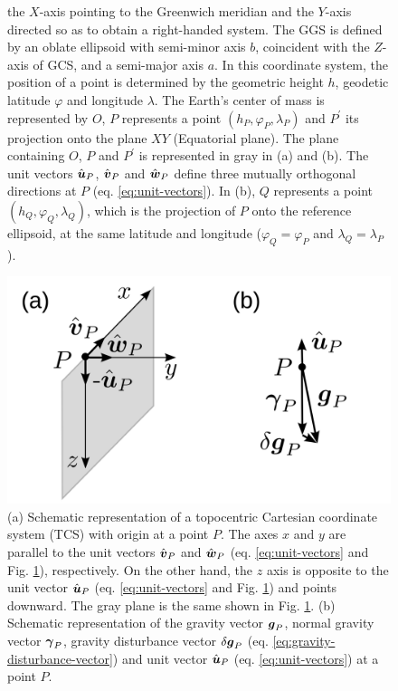 \documentclass[extra]{gji}
\begin{document}
\begin{figure}
{    the $X$-axis pointing to the Greenwich meridian and the $Y$-axis
    directed so as to obtain a right-handed system. The GGS is      defined by an oblate ellipsoid with semi-minor axis $b$,
    coincident with the $Z$-axis of GCS, and a semi-major
    axis $a$. In this coordinate system, the position of a point is
    determined by the geometric height $h$, geodetic latitude
    $\varphi$ and longitude $\lambda$.
    The Earth's center of mass is represented
    by $O$, $P$ represents a point $(h_{P}, \varphi_{P}, \lambda_{P})$ and $P^{\prime}$ its projection onto the plane $XY$
    (Equatorial plane). The plane containing $O$, $P$ and
    $P^{\prime}$ is represented in gray in (a) and (b).
    The unit vectors $\hat{\mitbf{u}}_{P}$, $\hat{\mitbf{v}}_{P}$ and
    $\hat{\mitbf{w}}_{P}$ define three mutually orthogonal
    directions at $P$ (eq. \ref{eq:unit-vectors}).
    In (b), $Q$ represents a point $(h_{Q}, \varphi_{Q}, \lambda_{Q})$,
    which is the projection of $P$ onto the reference ellipsoid, at
    the same latitude and longitude ($\varphi_{Q} = \varphi_{P}$ and $\lambda_{Q} = \lambda_{P}$).}
  \label{fig:GCS-GGS}
\end{figure}

\begin{figure}
    \includegraphics{figures/local-system.png}
    \caption{(a) Schematic representation of a topocentric Cartesian
    coordinate system (TCS) with origin at a point $P$. The axes $x$
    and $y$ are parallel to the unit vectors $\hat{\mitbf{v}}_{P}$
    and $\hat{\mitbf{w}}_{P}$ (eq. \ref{eq:unit-vectors} and
    Fig. \ref{fig:GCS-GGS}), respectively. On the other hand, the $z$ axis is opposite to the unit vector $\hat{\mitbf{u}}_{P}$ (eq.
    \ref{eq:unit-vectors} and Fig. \ref{fig:GCS-GGS}) and points downward. The gray plane is the same shown in Fig. \ref{fig:GCS-GGS}.
    (b) Schematic representation of the gravity vector
    $\mitbf{g}_{P}$, normal gravity vector $\mitbf{\gamma}_{P}$,
    gravity disturbance vector $\delta \mitbf{g}_{P}$
    (eq. \ref{eq:gravity-disturbance-vector}) and unit vector
    $\hat{\mitbf{u}}_{P}$ (eq. \ref{eq:unit-vectors}) at a point
    $P$.}
  \label{fig:TCS}
\end{figure}
\end{document}
